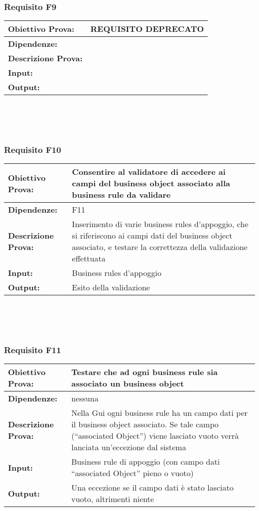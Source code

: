 \subsubsection{Requisito F9}
\begin{tabular}{||p{4cm}||p{8cm}||}
\hline
{\textbf {Obiettivo Prova:}}& REQUISITO DEPRECATO\\ \hline
{\textbf{Dipendenze:}}& \\ \hline
{\textbf{Descrizione Prova:}}& \\ \hline
{\textbf{Input:}}& \\ \hline
{\textbf{Output:}}&  \\ \hline
\end{tabular} \\
\\
\\
\subsubsection{Requisito F10}
\begin{tabular}{||p{4cm}||p{8cm}||}
\hline
{\textbf {Obiettivo Prova:}}& Consentire al validatore di accedere ai campi del business object associato alla business rule da validare \\ \hline
{\textbf{Dipendenze:}}& F11\\ \hline
{\textbf{Descrizione Prova:}}&  Inserimento di varie business rules d'appoggio, che si riferiscono ai campi dati del business object associato, e testare la correttezza della validazione effettuata \\ \hline
{\textbf{Input:}}&  Business rules d'appoggio \\ \hline
{\textbf{Output:}}& Esito della validazione \\ \hline
\end{tabular} \\
\\
\\
\subsubsection{Requisito F11}
\begin{tabular}{||p{4cm}||p{8cm}||}
\hline
{\textbf {Obiettivo Prova:}}& Testare che ad ogni business rule sia associato un business object \\ \hline
{\textbf{Dipendenze:}}& nessuna \\ \hline
{\textbf{Descrizione Prova:}}&  Nella Gui ogni business rule ha un campo dati per il business object associato. Se tale campo (``associated Object'') viene lasciato vuoto verr\`a lanciata un'eccezione dal sistema\\ \hline
{\textbf{Input:}}&  Business rule di appoggio (con campo dati ``associated Object'' pieno o vuoto)\\ \hline
{\textbf{Output:}}& Una eccezione se il campo dati \`e stato lasciato vuoto, altrimenti niente \\ \hline
\end{tabular} \\
\\
\\
